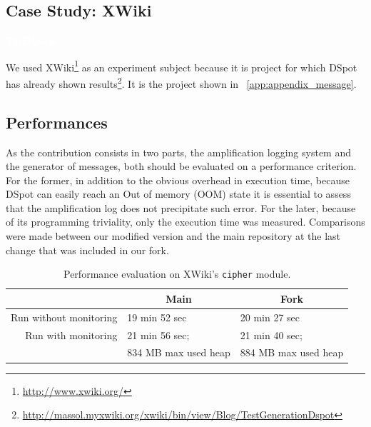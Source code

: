 \documentclass[a4paper,11pt]{sdm_internship}
\newcommand{\todo}[1]{\colorbox{Red!75}{\textcolor{white}{\textbf{TODO\ifx&#1&\else: #1\fi}}}}
\newcommand{\dspot}{DSpot\xspace}
\theoremstyle{definition}
\begin{document}
\subsection{Case Study: XWiki}%
\label{ssec:case_studies}
\todo{}

We used XWiki\footnote{\url{http://www.xwiki.org/}} as an experiment subject because it is project for which DSpot has already shown results\footnote{\url{http://massol.myxwiki.org/xwiki/bin/view/Blog/TestGenerationDspot}}.
It is the project shown in \appendixname~\ref{app:appendix_message}.

\subsection{Performances}%
\label{ssec:performances}
As the contribution consists in two parts, the amplification logging system and the generator of messages, both should be evaluated on a performance criterion.
For the former, in addition to the obvious overhead in execution time, because \dspot{} can easily reach an Out of memory (OOM) state it is essential to assess that the amplification log does not precipitate such error.
For the later, because of its programming triviality, only the execution time was measured.
Comparisons were made between our modified version and the main repository at the last change that was included in our fork.

\begin{table}
  \centering
  \begin{tabular}{rll}
    \toprule
    \multicolumn{1}{c}{} & \multicolumn{1}{c}{\textbf{Main}} & \multicolumn{1}{c}{\textbf{Fork}} \\
    \midrule
    Run without monitoring & 19 min 52 sec & 20 min 27 sec \\
    Run with monitoring & 21 min 56 sec; & 21 min 40 sec; \\
      & 834 MB max used heap & 884 MB max used heap \\
    \bottomrule
  \end{tabular}
  \caption{Performance evaluation on XWiki's \texttt{cipher} module\protect\footnotemark.}%
  \label{tab:perf_exp}
\end{table}
\end{document}
